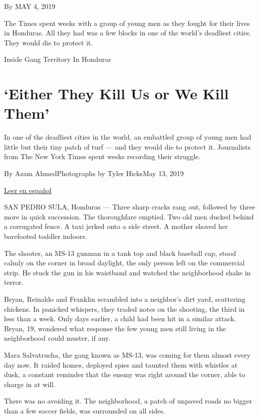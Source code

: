 By MAY 4, 2019

The Times spent weeks with a group of young men as they fought for their
lives in Honduras. All they had was a few blocks in one of the world's
deadliest cities. They would die to protect it.

Inside Gang Territory In Honduras

\hypertarget{either-they-kill-us-or-we-kill-them}{%
\section{`Either They Kill Us or We Kill
Them'}\label{either-they-kill-us-or-we-kill-them}}

In one of the deadliest cities in the world, an embattled group of young
men had little but their tiny patch of turf --- and they would die to
protect it. Journalists from The New York Times spent weeks recording
their struggle.

By Azam AhmedPhotographs by Tyler HicksMay 13, 2019

\href{https://www.nytimes3xbfgragh.onion/es/2019/05/04/honduras-mara-salvatrucha-violencia/}{Leer
en español}

SAN PEDRO SULA, Honduras --- Three sharp cracks rang out, followed by
three more in quick succession. The thoroughfare emptied. Two old men
ducked behind a corrugated fence. A taxi jerked onto a side street. A
mother shoved her barefooted toddler indoors.

The shooter, an MS-13 gunman in a tank top and black baseball cap, stood
calmly on the corner in broad daylight, the only person left on the
commercial strip. He stuck the gun in his waistband and watched the
neighborhood shake in terror.

Bryan, Reinaldo and Franklin scrambled into a neighbor's dirt yard,
scattering chickens. In panicked whispers, they traded notes on the
shooting, the third in less than a week. Only days earlier, a child had
been hit in a similar attack. Bryan, 19, wondered what response the few
young men still living in the neighborhood could muster, if any.

Mara Salvatrucha, the gang known as MS-13, was coming for them almost
every day now. It raided homes, deployed spies and taunted them with
whistles at dusk, a constant reminder that the enemy was right around
the corner, able to charge in at will.

There was no avoiding it. The neighborhood, a patch of unpaved roads no
bigger than a few soccer fields, was surrounded on all sides.

